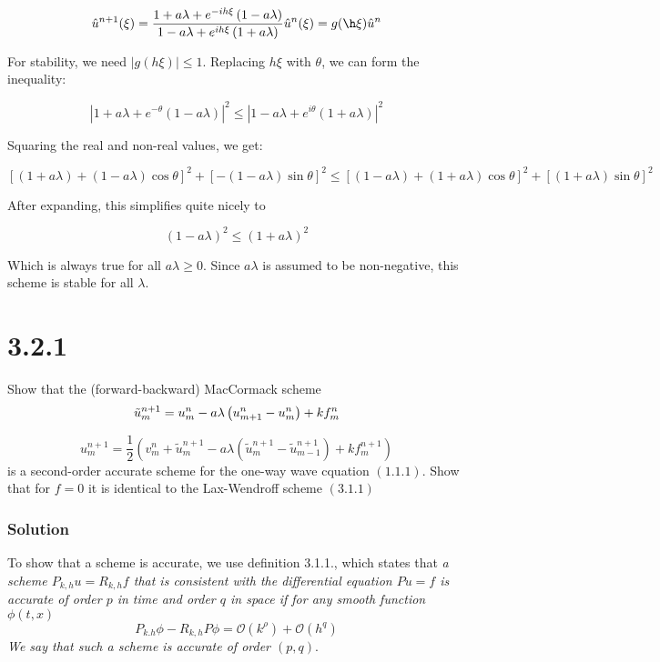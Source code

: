 \documentclass[12pt]{article}
\begin{document}
$$\hat{u}^{n+1}(\xi) = \frac{1 + {a\lambda} + e^{-ih\xi}\left(1 - a\lambda\right)}{1 - {a\lambda} + e^{ih\xi}\left(1+ {a\lambda}\right)}\hat{u}^n(\xi) = g(\h\xi)\hat{u}^n$$

\noindent For stability, we need $|g(h\xi)|\leq1$. Replacing $h\xi$ with $\theta$, we can form  the inequality:

$$\left|1 + {a\lambda} + e^{-\theta}\left(1 - a\lambda\right)\right|^2 \leq \left|1 - {a\lambda} + e^{i\theta}\left(1+ {a\lambda}\right)\right|^2$$

\noindent Squaring the real and non-real values, we get:

$$ [(1+a\lambda)+(1-a\lambda)\cos\theta]^2 + [-(1-a\lambda)\sin\theta]^2 \leq [(1-a\lambda)+(1+a\lambda)\cos\theta]^2 + [(1+a\lambda)\sin\theta]^2$$

\noindent After expanding, this simplifies quite nicely to

$$ (1-a\lambda)^2 \leq (1+a\lambda)^2 $$

\noindent Which is always true for all $a\lambda \geq 0$. Since $a\lambda$ is assumed to be non-negative, this scheme is stable for all $\lambda$.

\section*{3.2.1}
Show that the (forward-backward) MacCormack scheme
$$
{\tilde{u}_{m}^{n+1}=u_{m}^{n}-a \lambda\left(u_{m+1}^{n}-u_{m}^{n}\right)+k f_{m}^{n}} \\$$

$$
{u_{m}^{n+1}=\frac{1}{2}\left(v_{m}^{n}+\tilde{u}_{m}^{n+1}-a \lambda\left(\tilde{u}_{m}^{n+1}-\tilde{u}_{m-1}^{n+1}\right)+k f_{m}^{n+1}\right)}
$$
is a second-order accurate scheme for the one-way wave cquation $(1.1 .1) .$ Show that for $f=0$ it is identical to the Lax-Wendroff scheme $(3.1 .1)$

\subsubsection*{Solution}

To show that a scheme is accurate, we use definition 3.1.1., which states that \textit{a scheme $P_{k, h} u=R_{k, h} f$ that is consistent with the differential equation $P u=f$ is accurate of order $p$ in time and order $q$ in space if for any smooth function $\phi(t, x)$
$$
P_{k . h} \phi-R_{k, h} P \phi=\mathcal{O}\left(k^{\rho}\right)+\mathcal{O}\left(h^{q}\right)
$$
We say that such a scheme is accurate of order $(p, q)$}. 
\end{document}

